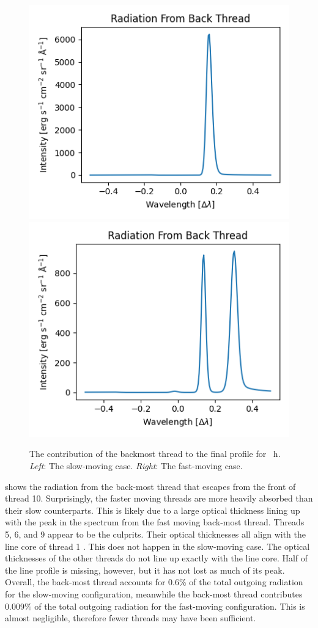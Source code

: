 \begin{figure}
    \centering
    \includegraphics[width=0.49\linewidth]{03Modelling2D/figs/slowback.png}
    \includegraphics[width=0.49\linewidth]{03Modelling2D/figs/fastback.png}
    \caption[The contribution of the back-most thread to the final profile.]{The contribution of the backmost thread to the final profile for \mgii~h. \textit{Left}: The slow-moving case. \textit{Right}: The fast-moving case.}
    \label{backthreads}
\end{figure}
 shows the radiation from the back-most thread that escapes from the front of thread 10. Surprisingly, the faster moving threads are more heavily absorbed than their slow counterparts. This is likely due to a large optical thickness lining up with the peak in the spectrum from the fast moving back-most thread. Threads 5, 6, and 9 appear to be the culprits. Their optical thicknesses all align with the line core of thread 1 . This does not happen in the slow-moving case. The optical thicknesses of the other threads do not line up exactly with the line core. Half of the line profile is missing, however, but it has not lost as much of its peak.
Overall, the back-most thread accounts for 0.6\% of the total outgoing radiation for the slow-moving configuration, meanwhile the back-most thread contributes 0.009\% of the total outgoing radiation for the fast-moving configuration. This is almost negligible, therefore fewer threads may have been sufficient. 
